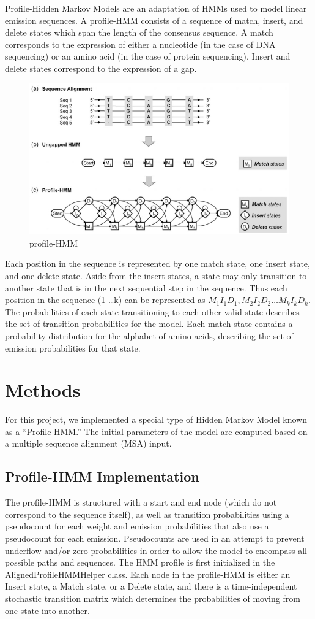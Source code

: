 \documentclass{article}
\begin{document}
Profile-Hidden Markov Models are an adaptation of HMMs used to model linear emission sequences. A profile-HMM consists of a sequence of match, insert, and delete states which span the length of the consensus sequence. A match corresponds to the expression of either a nucleotide (in the case of DNA sequencing) or an amino acid (in the case of protein sequencing). Insert and delete states correspond to the expression of a gap. 
\begin{figure}[H]
\centering
\includegraphics[width=.8\textwidth]{materials/profile-HMM.png}
\caption{profile-HMM\footnotemark[1]}
\end{figure}
Each position in the sequence is represented by one match state, one insert state, and one delete state. Aside from the insert states, a state may only transition to another state that is in the next sequential step in the sequence. Thus each position in the sequence (1 \ldots k) can be represented as $M_{1} I_{1} D_{1}, M_{2} I_{2} D_{2} \ldots M_{k} I_{k} D_{k}$. The probabilities of each state transitioning to each other valid state describes the set of transition probabilities for the model. Each match state contains a probability distribution for the alphabet of amino acids, describing the set of emission probabilities for that state.

\section{Methods}

For this project, we implemented a special type of Hidden Markov Model known as a ``Profile-HMM.'' The initial parameters of the model are computed based on a multiple sequence alignment (MSA) input.

\subsection{Profile-HMM Implementation}
The profile-HMM is structured with a start and end node (which do not correspond to the sequence itself), as well as transition probabilities using a pseudocount for each weight and emission probabilities that also use a pseudocount for each emission. Pseudocounts are used in an attempt to prevent underflow and/or zero probabilities in order to allow the model to encompass all possible paths and sequences. The HMM profile is first initialized in the AlignedProfileHMMHelper class. Each node in the profile-HMM is either an Insert state, a Match state, or a Delete state, and there is a time-independent stochastic transition matrix which determines the probabilities of moving from one state into another.
\end{document}
